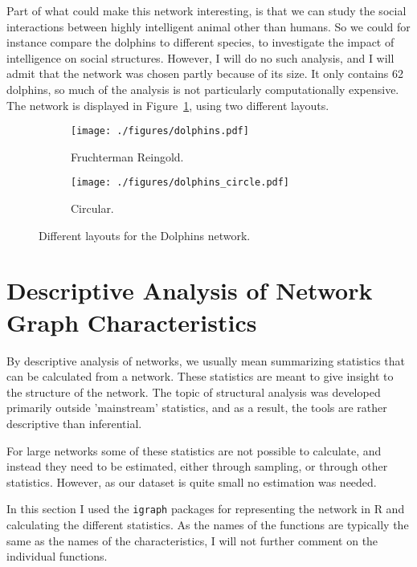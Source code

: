 \documentclass[11pt,a4paper]{article}
\begin{document}
Part of what could make this network interesting, is that we can study the social interactions between highly intelligent animal other than humans. So we could for instance compare the dolphins to different species, to investigate the impact of intelligence on social structures. However, I will do no such analysis, and I will admit that the network was chosen partly because of its size. It only contains 62 dolphins, so much of the analysis is not particularly computationally expensive.
The network is displayed in Figure~\ref{fig:dolphins}, using two different layouts. 
%
\begin{figure}[h!tbp]
    \centering
    \begin{subfigure}[b]{0.48\textwidth}
        \texttt{[image: ./figures/dolphins.pdf]}
        \caption{Fruchterman Reingold.}
    \end{subfigure}%
    \quad
    \begin{subfigure}[b]{0.48\textwidth}
        \texttt{[image: ./figures/dolphins\_circle.pdf]}
        \caption{Circular.}
    \end{subfigure}
    \vspace{1\baselineskip}
    \caption{Different layouts for the Dolphins network.}
    \label{fig:dolphins}
\end{figure}

\section{Descriptive Analysis of Network Graph Characteristics}
By descriptive analysis of networks, we usually mean summarizing statistics that can be calculated from a network. These statistics are meant to give insight to the structure of the network. The topic of structural analysis was developed primarily outside 'mainstream' statistics, and as a result, the tools are rather descriptive than inferential.

For large networks some of these statistics are not possible to calculate, and instead they need to be estimated, either through sampling, or through other statistics. However, as our dataset is quite small no estimation was needed. 

In this section I used the \verb+igraph+ packages for representing the network in R and calculating the different statistics. As the names of the functions are typically the same as the names of the characteristics, I will not further comment on the individual functions.
\end{document}
